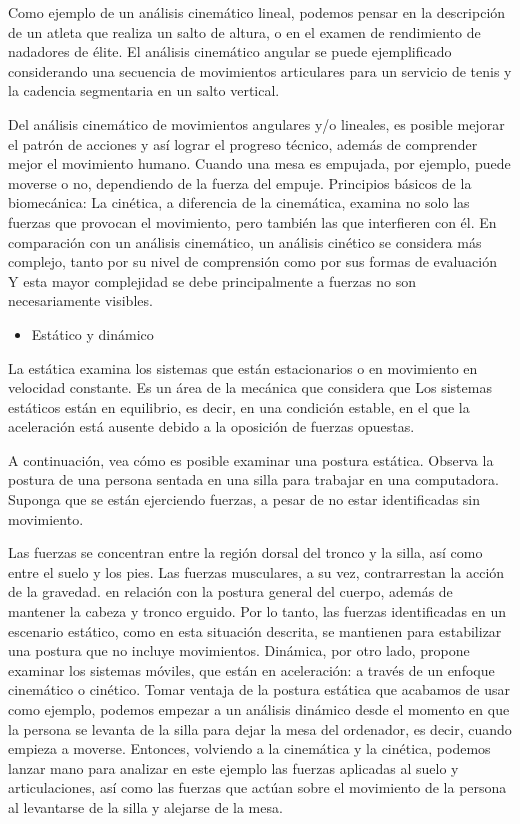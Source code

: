 \documentclass{article}
\begin{document}
Como ejemplo de un análisis cinemático lineal, podemos pensar en la descripción de un atleta que realiza un salto de altura, o en el examen de rendimiento de nadadores de élite. El análisis cinemático angular se puede ejemplificado considerando una secuencia de movimientos articulares para un servicio de tenis y la cadencia segmentaria en un salto vertical.

Del análisis cinemático de movimientos angulares y/o lineales, es posible mejorar el patrón de acciones y así lograr el progreso técnico, además de comprender mejor el movimiento humano. Cuando una mesa es empujada, por ejemplo, puede moverse o no, dependiendo de la fuerza del empuje. Principios básicos de la biomecánica: La cinética, a diferencia de la cinemática, examina no solo las fuerzas que provocan el movimiento, pero también las que interfieren con él. En comparación con un análisis cinemático, un análisis cinético se considera más complejo, tanto por su nivel de comprensión como por sus formas de evaluación Y esta mayor complejidad se debe principalmente a fuerzas no son necesariamente visibles. \cite{ff6}
\begin{itemize}
\item Estático y dinámico
\end{itemize} 
La estática examina los sistemas que están estacionarios o en movimiento en velocidad constante. Es un área de la mecánica que considera que Los sistemas estáticos están en equilibrio, es decir, en una condición estable, en el que la aceleración está ausente debido a la oposición de fuerzas opuestas.

A continuación, vea cómo es posible examinar una postura estática. Observa la postura de una persona sentada en una silla para trabajar en una computadora. Suponga que se están ejerciendo fuerzas, a pesar de no estar identificadas sin movimiento.

Las fuerzas se concentran entre la región dorsal del tronco y la silla, así como entre el suelo y los pies. Las fuerzas musculares, a su vez, contrarrestan la acción de la gravedad. en relación con la postura general del cuerpo, además de mantener la cabeza y tronco erguido. Por lo tanto, las fuerzas identificadas en un escenario estático, como en esta situación descrita, se mantienen para estabilizar una postura que no incluye movimientos.  Dinámica, por otro lado, propone examinar los sistemas móviles, que están en aceleración: a través de un enfoque cinemático o cinético. Tomar ventaja de la postura estática que acabamos de usar como ejemplo, podemos empezar a un análisis dinámico desde el momento en que la persona se levanta de la silla para dejar la mesa del ordenador, es decir, cuando empieza a moverse. Entonces, volviendo a la cinemática y la cinética, podemos lanzar mano para analizar en este ejemplo las fuerzas aplicadas al suelo y articulaciones, así como las fuerzas que actúan sobre el movimiento de la persona al levantarse de la silla y alejarse de la mesa. \cite{ff6}


\end{document}
